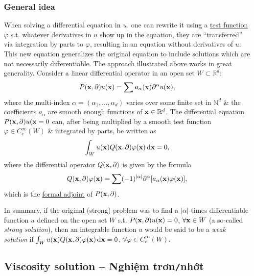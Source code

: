 \documentclass{article}
\begin{document}
\subsubsection{General idea}
When solving a differential equation in $u$, one can rewrite it using a \href{https://en.wikipedia.org/wiki/Test_function}{test function} $\varphi$ s.t. whatever derivatives in $u$ show up in the equation, they are ``transferred'' via integration by parts to $\varphi$, resulting in an equation without derivatives of $u$. This new equation generalizes the original equation to include solutions which are not necessarily differentiable. The approach illustrated above works in great generality. Consider a linear differential operator in an open set $W\subset\mathbb{R}^d$:
\begin{equation*}
	P({\bf x},\partial)u({\bf x}) = \sum a_\alpha({\bf x})\partial^\alpha u({\bf x}),
\end{equation*}
where the multi-index $\alpha = (\alpha_1,\ldots,\alpha_d)$ varies over some finite set in $\mathbb{N}^d$ \& the coefficients $a_\alpha$ are smooth enough functions of ${\bf x}\in\mathbb{R}^d$. The differential equation $P({\bf x},\partial)u({\bf x} = 0$ can, after being multiplied by a smooth test function $\varphi\in C_c^\infty(W)$ \& integrated by parts, be written as
\begin{equation*}
	\int_W u({\bf x})Q({\bf x},\partial)\varphi({\bf x})\,{\rm d}{\bf x} = 0,
\end{equation*}
where the differential operator $Q({\bf x},\partial)$ is given by the formula
\begin{equation*}
	Q({\bf x},\partial)\varphi({\bf x}) = \sum (-1)^{|\alpha|}\partial^\alpha[a_\alpha({\bf x})\varphi({\bf x})],
\end{equation*}
which is the \href{https://en.wikipedia.org/wiki/Formal_adjoint}{formal adjoint} of $P({\bf x},\partial)$.

In summary, if the original (strong) problem was to find a $|\alpha|$-times differentiable function $u$ defined on the open set $W$ s.t. $P({\bf x},\partial)u({\bf x}) = 0$, $\forall{\bf x}\in W$ (a so-called {\it strong solution}), then an integrable function $u$ would be said to be a {\it weak solution} if $\int_W u({\bf x})Q({\bf x},\partial)\varphi({\bf x})\,{\rm d}{\bf x} = 0$, $\forall\varphi\in C_c^\infty(W)$.


\subsection{Viscosity solution -- Nghiệm trơn{\tt/}nhớt}
\end{document}
